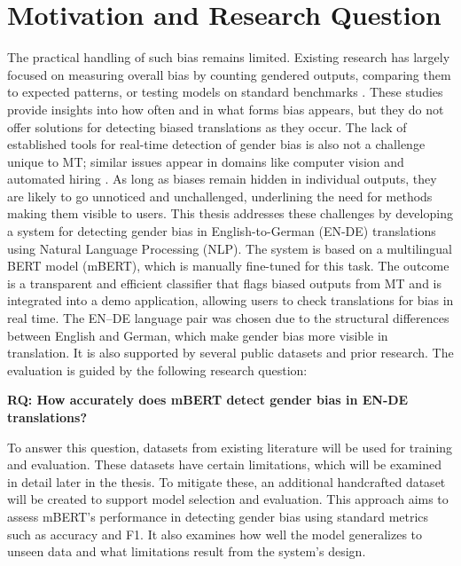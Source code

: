 \section{Motivation and Research Question}
    The practical handling of such bias remains limited. Existing research has largely focused on measuring overall bias by counting gendered outputs, comparing them to expected patterns, or testing models on standard benchmarks \parencite{rescignoGenderBiasMachine2023,barclayInvestigatingMarkersDrivers2024a,pratesAssessingGenderBias2019,savoldiWhatHarmQuantifying2024}. These studies provide insights into how often and in what forms bias appears, but they do not offer solutions for detecting biased translations as they occur. The lack of established tools for real-time detection of gender bias is also not a challenge unique to MT; similar issues appear in domains like computer vision and automated hiring \parencite{schwemmerDiagnosingGenderBias2020}. As long as biases remain hidden in individual outputs, they are likely to go unnoticed and unchallenged, underlining the need for methods making them visible to users. This thesis addresses these challenges by developing a system for detecting gender bias in English-to-German (EN-DE) translations using Natural Language Processing (NLP). The system is based on a multilingual BERT model (mBERT), which is manually fine-tuned for this task. The outcome is a transparent and efficient classifier that flags biased outputs from MT and is integrated into a demo application, allowing users to check translations for bias in real time. The EN–DE language pair was chosen due to the structural differences between English and German, which make gender bias more visible in translation. It is also supported by several public datasets and prior research. The evaluation is guided by the following research question:

    \vspace{0.8em}
    \noindent \textbf{RQ: How accurately does mBERT detect gender bias in EN-DE translations?}

    \vspace{0.8em}

    \noindent To answer this question, datasets from existing literature will be used for training and evaluation. These datasets have certain limitations, which will be examined in detail later in the thesis. To mitigate these, an additional handcrafted dataset will be created to support model selection and evaluation. This approach aims to assess mBERT’s performance in detecting gender bias using standard metrics such as accuracy and F1. It also examines how well the model generalizes to unseen data and what limitations result from the system’s design.

